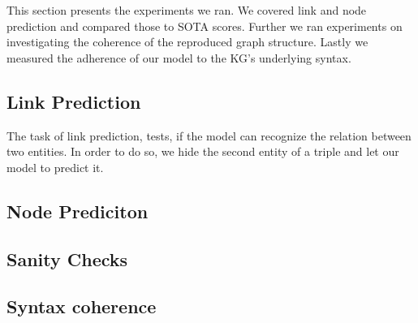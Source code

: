 
This section presents the experiments we ran. We covered link and node prediction and compared those to SOTA scores. Further we ran experiments on investigating the coherence of the reproduced graph structure. Lastly we measured the adherence of our model to the KG's underlying syntax.

\subsection{Link Prediction}
The task of link prediction, tests, if the model can recognize the relation between two entities. In order to do so, we hide the second entity of a triple and let our model to predict it.

\subsection{Node Prediciton}

\subsection{Sanity Checks}

\subsection{Syntax coherence}